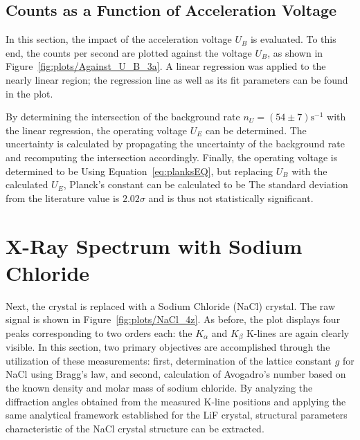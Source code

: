 \subsection{Counts as a Function of Acceleration Voltage}
In this section, the impact of the acceleration voltage $U_B$ is evaluated. To this end, the counts per second are plotted against the voltage $U_B$, as shown in Figure~\ref{fig:plots/Against_U_B_3a}. A linear regression was applied to the nearly linear region; the regression line as well as its fit parameters can be found in the plot.

By determining the intersection of the background rate $n_U = (54 \pm 7) \mathrm{s^{-1}}$ with the linear regression, the operating voltage $U_E$ can be determined. The uncertainty is calculated by propagating the uncertainty of the background rate and recomputing the intersection accordingly. Finally, the operating voltage is determined to be
Using Equation~\ref{eq:planksEQ}, but replacing $U_B$ with the calculated $U_E$, Planck's constant can be calculated to be
The standard deviation from the literature value is $2.02\sigma$ and is thus not statistically significant.

\section{X-Ray Spectrum with Sodium Chloride}
\label{sec:A2}
Next, the crystal is replaced with a Sodium Chloride (NaCl) crystal. The raw signal is shown in Figure~\ref{fig:plots/NaCl_4z}.
As before, the plot displays four peaks corresponding to two orders each: the $K_\alpha$ and $K_\beta$ K-lines are again clearly visible.
In this section, two primary objectives are accomplished through the utilization of these measurements: first, determination of the lattice constant $g$ for NaCl using Bragg's law, and second, calculation of Avogadro's number based on the known density and molar mass of sodium chloride. By analyzing the diffraction angles obtained from the measured K-line positions and applying the same analytical framework established for the LiF crystal, structural parameters characteristic of the NaCl crystal structure can be extracted. 

